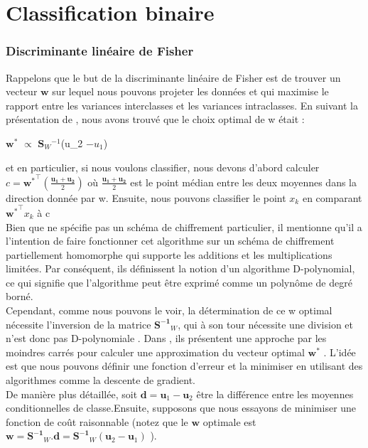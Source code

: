 \section{Classification binaire}
\subsubsection{Discriminante linéaire de Fisher}
Rappelons que le but de la discriminante linéaire de Fisher est de trouver un vecteur $\mathbf{w}$ sur lequel nous pouvons projeter les données et qui maximise le rapport entre les variances interclasses et les variances intraclasses. En suivant la présentation de \cite{7}, nous avons trouvé que le choix optimal de w était :
\begin{center}
  $\mathbf{w}^{*}$ $\propto$  $\mathbf{S}{_W}^{-1}$(u{_2} $-u{_1} $)
\end{center}
et en particulier, si nous voulons classifier, nous devons d'abord calculer $ c = \mathbf{w^*}^\intercal(\frac{\mathbf{u_{1}}+\mathbf{u_{2}}}{2}) $ où $\frac{\mathbf{u_{1}}+\mathbf{u_{2}}}{2}$ est le point médian entre les deux moyennes dans la direction donnée par w. Ensuite, nous pouvons classifier le point $x_{k}$ en comparant $ \mathbf{w^*}^\intercal x_{k}$ à c\\
Bien que \cite{21} ne spécifie pas un schéma de chiffrement particulier, il mentionne qu'il a l'intention de faire fonctionner cet algorithme sur un schéma de chiffrement partiellement homomorphe  qui supporte les additions et les multiplications limitées. Par conséquent, ils définissent la notion d'un algorithme D-polynomial, ce qui signifie que l'algorithme peut être exprimé comme un polynôme de degré borné.\\
Cependant, comme nous pouvons le voir, la détermination de ce w optimal nécessite l'inversion de la matrice $\mathbf{S^{-1}}_{W}$, qui à son tour nécessite une division et n'est donc pas D-polynomiale \cite{21}. Dans \cite{21}, ils présentent une approche par les moindres carrés pour calculer une approximation du vecteur optimal $\mathbf{w^{*}}$ . L'idée est que nous pouvons définir une fonction d'erreur et la minimiser en utilisant des algorithmes comme la descente de gradient.\\
De manière plus détaillée, soit $ \mathbf{d} = \mathbf{u}_{1} - \mathbf{u}_{2}$ être la différence entre les moyennes conditionnelles de classe.Ensuite, supposons que nous essayons de minimiser une fonction de coût raisonnable (notez que le $\mathbf{w} $ optimale est $ \mathbf{w} =\mathbf{S^{-1}}_{W}.\mathbf{d} = \mathbf{S^{-1}}_{W} (\mathbf{u}_{2} - \mathbf{u}_1)$ ).
